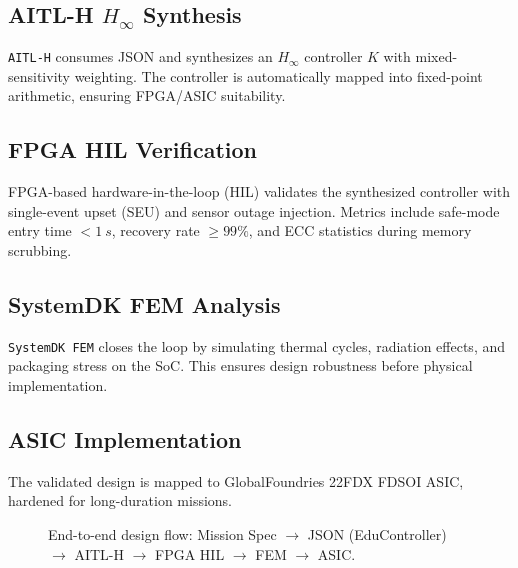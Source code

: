 \documentclass[conference]{IEEEtran}
\begin{document}
\subsection{AITL-H $H_\infty$ Synthesis}
\texttt{AITL-H} consumes JSON and synthesizes an $H_\infty$ controller $K$ with mixed-sensitivity weighting. The controller is automatically mapped into fixed-point arithmetic, ensuring FPGA/ASIC suitability.

\subsection{FPGA HIL Verification}
FPGA-based hardware-in-the-loop (HIL) validates the synthesized controller with single-event upset (SEU) and sensor outage injection. Metrics include safe-mode entry time $< \SI{1}{s}$, recovery rate $\ge 99\%$, and ECC statistics during memory scrubbing.

\subsection{SystemDK FEM Analysis}
\texttt{SystemDK FEM} closes the loop by simulating thermal cycles, radiation effects, and packaging stress on the SoC. This ensures design robustness before physical implementation.

\subsection{ASIC Implementation}
The validated design is mapped to GlobalFoundries 22FDX FD\!SOI ASIC, hardened for long-duration missions.

\begin{figure}[t]
\centering
{}
\caption{End-to-end design flow: Mission Spec $\to$ JSON (EduController) $\to$ AITL-H $\to$ FPGA HIL $\to$ FEM $\to$ ASIC.}
\label{fig:flow}
\end{figure}
\end{document}
